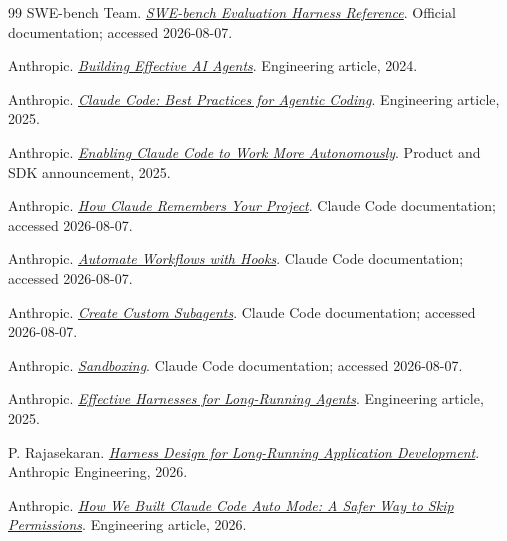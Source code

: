 \documentclass[10pt,a4paper,UTF8,fontset=none]{ctexart}
\begin{document}
\begin{thebibliography}{99}
SWE-bench Team. \href{https://www.swebench.com/SWE-bench/reference/harness/}{\textit{SWE-bench Evaluation Harness Reference}}. Official documentation; accessed 2026-08-07.

Anthropic. \href{https://www.anthropic.com/engineering/building-effective-agents}{\textit{Building Effective AI Agents}}. Engineering article, 2024.

Anthropic. \href{https://www.anthropic.com/engineering/claude-code-best-practices}{\textit{Claude Code: Best Practices for Agentic Coding}}. Engineering article, 2025.

Anthropic. \href{https://www.anthropic.com/news/enabling-claude-code-to-work-more-autonomously}{\textit{Enabling Claude Code to Work More Autonomously}}. Product and SDK announcement, 2025.

Anthropic. \href{https://code.claude.com/docs/en/memory}{\textit{How Claude Remembers Your Project}}. Claude Code documentation; accessed 2026-08-07.

Anthropic. \href{https://code.claude.com/docs/en/hooks-guide}{\textit{Automate Workflows with Hooks}}. Claude Code documentation; accessed 2026-08-07.

Anthropic. \href{https://code.claude.com/docs/en/sub-agents}{\textit{Create Custom Subagents}}. Claude Code documentation; accessed 2026-08-07.

Anthropic. \href{https://code.claude.com/docs/en/sandboxing}{\textit{Sandboxing}}. Claude Code documentation; accessed 2026-08-07.

Anthropic. \href{https://www.anthropic.com/engineering/effective-harnesses-for-long-running-agents}{\textit{Effective Harnesses for Long-Running Agents}}. Engineering article, 2025.

P. Rajasekaran. \href{https://www.anthropic.com/engineering/harness-design-long-running-apps}{\textit{Harness Design for Long-Running Application Development}}. Anthropic Engineering, 2026.

Anthropic. \href{https://www.anthropic.com/engineering/claude-code-auto-mode}{\textit{How We Built Claude Code Auto Mode: A Safer Way to Skip Permissions}}. Engineering article, 2026.


\end{thebibliography}
\end{document}
